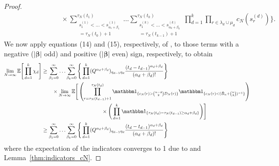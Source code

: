 \begin{proof}
\begin{align*}
    &\hspace{3cm}\times \sum_{\substack{ s_1^{ ( 1 ) } < \ldots < 
        s_{ \alpha_1 + \beta_1 }^{ ( 1 ) } \\= \tau_N( t_0 ) + 1 }}^{ \tau_N( t_1 ) } \ldots 
        \sum_{\substack{ s_1^{ ( k ) } < \ldots < s_{ \alpha_k + \beta_k }^{ ( k ) } 
        \\= \tau_N( t_{ k - 1 } ) + 1 }}^{ \tau_N( t_k ) } 
        \prod_{ d = 1 }^k \prod_{ r \in \lambda_d \cup \mu_d } 
        c_N( s_r^{ ( d ) } ) \Bigg\}.
\end{align*}
We now apply equations (14) and (15), respectively, of \textcite{koskela2018},  to those terms with a negative ($|\bm{\beta}|$ odd) and positive ($|\bm{\beta}|$ even) sign, respectively, to obtain
\begin{align*}
\lim_{ N \rightarrow \infty } \E\Bigg[ \prod_{ d = 1 }^k \chi_d \Bigg]
&\geq \sum_{ \beta_1 = 0 }^{ \infty } \ldots \sum_{ \beta_k = 0 }^{ \infty } 
        \Bigg\{ \prod_{ d = 1 }^k ( Q^{ \alpha_d + \beta_d } )_{ \eta_{ d - 1 } \eta_d } 
        \frac{ ( t_d - t_{ d - 1 } )^{ \alpha_d + \beta_d } }{ ( \alpha_d + \beta_d ) ! } 
        \Bigg\} \\
    &\qquad\times \lim_{ N \rightarrow \infty } \E\Bigg[ 
        \left( \prod_{r=\tau_N(t_{d-1})+1}^{\tau_N(t_d)}
        \I{ c_N(r) > \binom{n-2}{2} D_N(r) } 
        \I{ c_N(r) < (\tilde{B}_n + \binom{n}{2})^{-1} } \right) \\
    &\hspace{4cm}\times \Bigg( \prod_{ d = 1 }^k
        \I{ \tau_N( t_d ) - \tau_N( t_{ d - 1 } ) \geq \alpha_d + \beta_d } \Bigg) \Bigg] \\
&\geq \sum_{ \beta_1 = 0 }^{ \infty } \ldots \sum_{ \beta_k = 0 }^{ \infty } 
        \Bigg\{ \prod_{ d = 1 }^k ( Q^{ \alpha_d + \beta_d } )_{ \eta_{ d - 1 } \eta_d } 
        \frac{ ( t_d - t_{ d - 1 } )^{ \alpha_d + \beta_d } }{ ( \alpha_d + \beta_d ) ! } 
        \Bigg\} 
\end{align*}
where the expectation of the indicators converges to 1 due to \textcite[Equation (16)]{koskela2018} and Lemma~\ref{thm:indicators_cN}. 
\end{proof}

